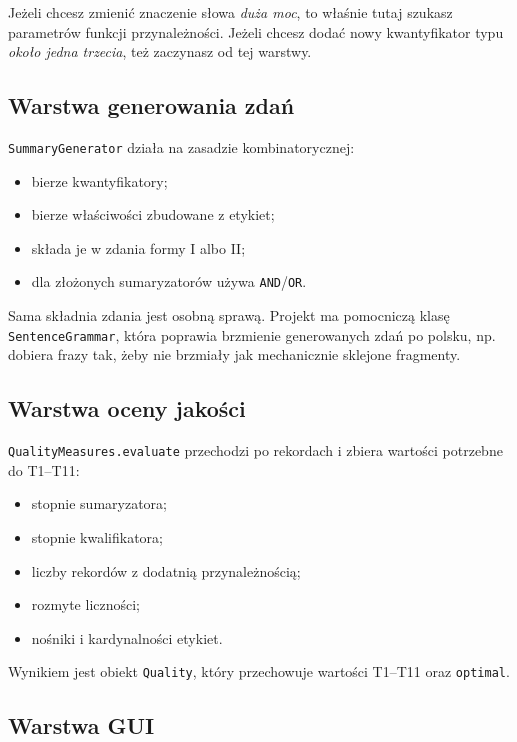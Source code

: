 \documentclass[11pt,a4paper]{article}
\newcommand{\code}[1]{\texttt{#1}}
\begin{document}
Jeżeli chcesz zmienić znaczenie słowa \emph{duża moc}, to właśnie tutaj szukasz parametrów funkcji przynależności. Jeżeli chcesz dodać nowy kwantyfikator typu \emph{około jedna trzecia}, też zaczynasz od tej warstwy.

\subsection{Warstwa generowania zdań}

\code{SummaryGenerator} działa na zasadzie kombinatorycznej:

\begin{itemize}
    \item bierze kwantyfikatory;
    \item bierze właściwości zbudowane z etykiet;
    \item składa je w zdania formy I albo II;
    \item dla złożonych sumaryzatorów używa \code{AND}/\code{OR}.
\end{itemize}

Sama składnia zdania jest osobną sprawą. Projekt ma pomocniczą klasę \code{SentenceGrammar}, która poprawia brzmienie generowanych zdań po polsku, np. dobiera frazy tak, żeby nie brzmiały jak mechanicznie sklejone fragmenty.

\subsection{Warstwa oceny jakości}

\code{QualityMeasures.evaluate} przechodzi po rekordach i zbiera wartości potrzebne do T1--T11:

\begin{itemize}
    \item stopnie sumaryzatora;
    \item stopnie kwalifikatora;
    \item liczby rekordów z dodatnią przynależnością;
    \item rozmyte liczności;
    \item nośniki i kardynalności etykiet.
\end{itemize}

Wynikiem jest obiekt \code{Quality}, który przechowuje wartości T1--T11 oraz \code{optimal}.

\subsection{Warstwa GUI}
\end{document}
